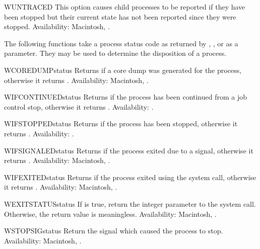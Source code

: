 \begin{datadesc}{WUNTRACED}
This option causes child processes to be reported if they have been
stopped but their current state has not been reported since they were
stopped.
Availability: Macintosh, \UNIX.
\end{datadesc}

The following functions take a process status code as returned by
, , or  as a
parameter.  They may be used to determine the disposition of a
process.

\begin{funcdesc}{WCOREDUMP}{status}
Returns  if a core dump was generated for the process,
otherwise it returns .
Availability: Macintosh, \UNIX.
\end{funcdesc}

\begin{funcdesc}{WIFCONTINUED}{status}
Returns  if the process has been continued from a job
control stop, otherwise it returns .
Availability: \UNIX.
\end{funcdesc}

\begin{funcdesc}{WIFSTOPPED}{status}
Returns  if the process has been stopped, otherwise it
returns .
Availability: \UNIX.
\end{funcdesc}

\begin{funcdesc}{WIFSIGNALED}{status}
Returns  if the process exited due to a signal, otherwise
it returns .
Availability: Macintosh, \UNIX.
\end{funcdesc}

\begin{funcdesc}{WIFEXITED}{status}
Returns  if the process exited using the 
system call, otherwise it returns .
Availability: Macintosh, \UNIX.
\end{funcdesc}

\begin{funcdesc}{WEXITSTATUS}{status}
If  is true, return the integer
parameter to the  system call.  Otherwise, the return
value is meaningless.
Availability: Macintosh, \UNIX.
\end{funcdesc}

\begin{funcdesc}{WSTOPSIG}{status}
Return the signal which caused the process to stop.
Availability: Macintosh, \UNIX.
\end{funcdesc}


